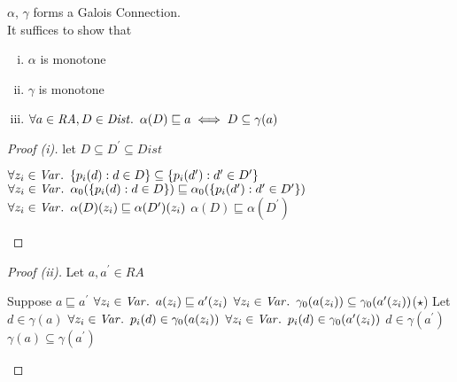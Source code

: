 \begin{prop}
  $\alpha$, $\gamma$ forms a Galois Connection.\\
  It suffices to show that
  \begin{enumerate}[(i)]
    \item $\alpha$ is monotone
    \item $\gamma$ is monotone
    \item $\forall a\in\mathit{RA},D\in\mathit{Dist}\ldotp~\alpha(D)\sqsubseteq a\iff D\subseteq\gamma(a)$
  \end{enumerate}

  \begin{proof}[Proof (i)]
    let $D\subseteq D^\prime\subseteq\mathit{Dist}$
    \begin{itemize}
      \step[\imps] $\forall z_i\in\mathit{Var}\ldotp~\{p_i(d) : d\in D\} \subseteq \{p_i(d^\prime) : d^\prime\in D^\prime\}$
      \step[\imps] $\forall z_i\in\mathit{Var}\ldotp~\alpha_0(\{p_i(d) : d\in D\}) \sqsubseteq \alpha_0(\{p_i(d^\prime) : d^\prime\in D^\prime\})$
      \step[\iffs] $\forall z_i\in\mathit{Var}\ldotp~\alpha(D)(z_i) \sqsubseteq\alpha(D^\prime)(z_i)$
      \step[\iffs] $\alpha(D)\sqsubseteq\alpha(D^\prime)$\qedhere
    \end{itemize}
  \end{proof}

  \begin{proof}[Proof (ii)]
    Let $a,a^\prime\in\mathit{RA}$
    \begin{itemize}
      \step Suppose $a\sqsubseteq a^\prime$
      \step[\iffs] $\forall z_i\in\mathit{Var}\ldotp~a(z_i)\sqsubseteq a^\prime(z_i)$
      \step[\imps] $\forall z_i\in\mathit{Var}\ldotp~\gamma_0(a(z_i))\subseteq\gamma_0(a^\prime(z_i))$\hfill($\star$)
      \step Let $d\in\gamma(a)$
      \step[\iffs] $\forall z_i\in\mathit{Var}\ldotp~p_i(d)\in\gamma_0(a(z_i))$
      \step[\imps] $\forall z_i\in\mathit{Var}\ldotp~p_i(d)\in\gamma_0(a^\prime(z_i))$
      \step[\imps] $d\in\gamma(a^\prime)$
      \step[\imps] $\gamma(a)\subseteq\gamma(a^\prime)$\qedhere
    \end{itemize}
  \end{proof}


\end{prop}
